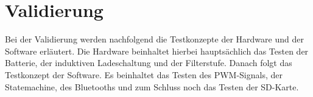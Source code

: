 \section{Validierung} \label{sec:validierung}

Bei der Validierung werden nachfolgend die Testkonzepte der Hardware und der Software erläutert. Die Hardware beinhaltet hierbei hauptsächlich das Testen der Batterie, der induktiven Ladeschaltung und der Filterstufe. Danach folgt das Testkonzept der Software. Es beinhaltet das Testen des PWM-Signals, der Statemachine, des Bluetooths und zum Schluss noch das Testen der SD-Karte.